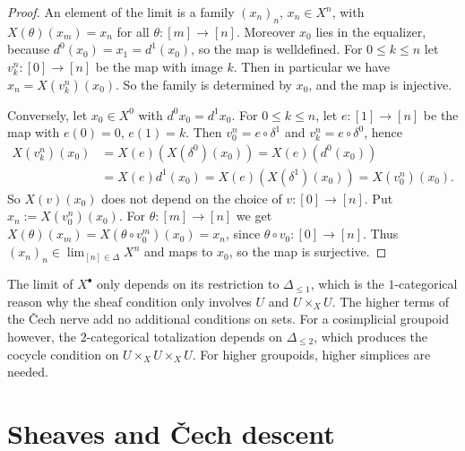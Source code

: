 \begin{proof}
	An element of the limit is a family $(x_n)_n$, $x_n\in X^n$, with $X(\theta)(x_m)=x_n$ for all $\theta:[m]\to[n]$.
	Moreover $x_0$ lies in the equalizer, because $d^0(x_0)=x_1=d^1(x_0)$, so the map is welldefined.
	For $0\le k\le n$ let $v_k^n:[0]\to[n]$ be the map with image $k$. Then in particular we have $x_n = X(v_k^n)(x_0)$.
	So the family is determined by $x_0$, and the map is injective.
	
	Conversely, let $x_0\in X^0$ with $d^0x_0=d^1x_0$. For $0\le k\le n$, let $e:[1]\to[n]$ be the map with $e(0)=0$, $e(1)=k$. Then $v_0^n = e\circ\delta^1$ and $v_k^n = e\circ\delta^0$, hence
	\begin{align*}
		X(v_k^n)(x_0) &= X(e)(X(\delta^0)(x_0)) = X(e)(d^0(x_0)) \\
		&= X(e) d^1(x_0) =  X(e)(X(\delta^1)(x_0)) = X(v_0^n)(x_0).
	\end{align*}
	So $X(v)(x_0)$ does not depend on the choice of $v:[0]\to[n]$. Put $x_n:=X(v_0^n)(x_0)$. For $\theta:[m]\to[n]$ we get $X(\theta)(x_m)=X(\theta\circ v_0^m)(x_0)=x_n$, since $\theta\circ v_0:[0]\to[n]$. Thus $(x_n)_n\in \lim_{[n]\in\Delta}X^n$ and maps to $x_0$, so the map is surjective.
\end{proof}

\begin{remark}
	The limit of $X^\bullet$ only depends on its restriction to $\Delta_{\le 1}$, which is the $1$-categorical reason why the sheaf condition only involves $U$ and $U\times_X U$. The higher terms of the \v{C}ech nerve add no additional conditions on sets. For a cosimplicial groupoid however, the $2$-categorical totalization depends on $\Delta_{\le 2}$, which produces the cocycle condition on $U\times_X U\times_X U$.
	For higher groupoids, higher simplices are needed.
\end{remark}

\section{Sheaves and \v{C}ech descent}

